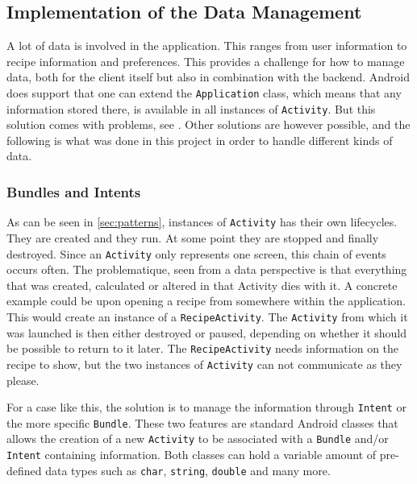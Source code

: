 \subsection{Implementation of the Data Management}
\label{subsec:datamanagement}

A lot of data is involved in the application. This ranges from user information to recipe information and preferences. This provides a challenge for how to manage data, both for the client itself but also in combination with the backend. Android does support that one can extend the \texttt{Application} class, which means that any information stored there, is available in all instances of \texttt{Activity}. But this solution comes with problems, see \citep{application_storage}. Other solutions are however possible, and the following is what was done in this project in order to handle different kinds of data.

\subsubsection{Bundles and Intents}
\label{subsubsec:bundles_and_intents}

As can be seen in \ref{sec:patterns}, instances of \texttt{Activity} has their own lifecycles. They are created and they run. At some point they are stopped and finally destroyed. Since an \texttt{Activity} only represents one screen, this chain of events occurs often. The problematique, seen from a data perspective is that everything that was created, calculated or altered in that Activity dies with it.
A concrete example could be upon opening a recipe from somewhere within the application. This would create an instance of a \texttt{RecipeActivity}. The \texttt{Activity} from which it was launched is then either destroyed or paused, depending on whether it should be possible to return to it later. The \texttt{RecipeActivity} needs information on the recipe to show, but the two instances of \texttt{Activity} can not communicate as they please.

For a case like this, the solution is to manage the information through \texttt{Intent} or the more specific \texttt{Bundle}. These two features are standard Android classes that allows the creation of a new \texttt{Activity} to be associated with a \texttt{Bundle} and/or \texttt{Intent} containing information\cite{intent}\cite{bundle}. Both classes can hold a variable amount of pre-defined data types such as \texttt{char}, \texttt{string}, \texttt{double} and many more.

